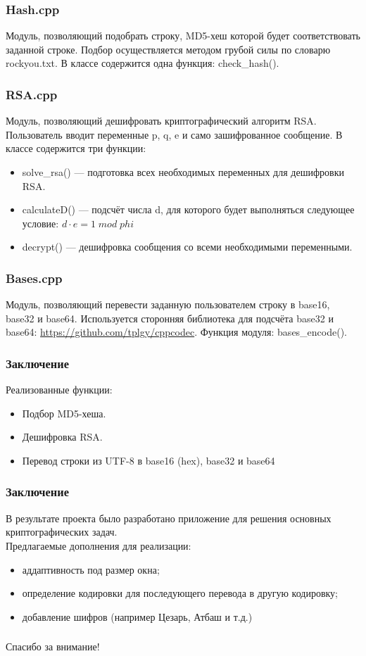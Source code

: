 \documentclass[hyperref={unicode}]{beamer}
\begin{document}
\begin{frame}
    \frametitle{Hash.cpp}
    Модуль, позволяющий подобрать строку, MD5-хеш которой будет соответствовать заданной строке. Подбор осуществляется методом грубой силы по словарю rockyou.txt. В классе содержится одна функция: check\_hash().
\end{frame}

\begin{frame}
    \frametitle{RSA.cpp}
    Модуль, позволяющий дешифровать криптографический алгоритм RSA. Пользователь вводит переменные p, q, e и само зашифрованное сообщение. В классе содержится три функции:
    \begin{itemize}
        \item solve\_rsa() --- подготовка всех необходимых переменных для дешифровки RSA.
        \item calculateD() --- подсчёт числа d, для которого будет выполняться следующее условие: $d \cdot e = 1\; mod \; phi$
        \item decrypt() --- дешифровка сообщения со всеми необходимыми переменными.
    \end{itemize} 
\end{frame}

\begin{frame}
    \frametitle{Bases.cpp}
    Модуль, позволяющий перевести заданную пользователем строку в base16, base32 и base64. Используется сторонняя библиотека для подсчёта base32 и base64: \url{https://github.com/tplgy/cppcodec}. Функция модуля: bases\_encode().
\end{frame}

\begin{frame}
  \frametitle{Заключение}
  
  Реализованные функции:
  
  \begin{itemize}
    \item Подбор MD5-хеша.
    \item Дешифровка RSA.
    \item Перевод строки из UTF-8 в base16 (hex), base32 и base64
  \end{itemize}
  
\end{frame}

\begin{frame}
    \frametitle{Заключение}
    
    В результате проекта было разработано приложение для решения основных криптографических задач.\\

    Предлагаемые дополнения для реализации: 
    \begin{itemize}
        \item аддаптивность под размер окна;
        \item определение кодировки для последующего перевода в другую кодировку;
        \item добавление шифров (например Цезарь, Атбаш и т.д.)
    \end{itemize}
    
\end{frame}
  
\begin{frame}
  \frametitle{}
  
{\Large\mbox{}\hfil Спасибо за внимание!}
  
\end{frame}
\end{document}
